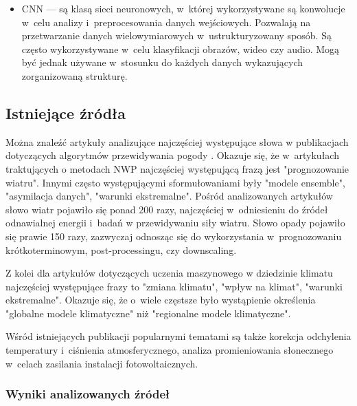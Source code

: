 \begin{itemize}
    \item CNN — są klasą sieci neuronowych, w~której wykorzystywane są konwolucje w~celu 
    analizy i~preprocesowania danych wejściowych. Pozwalają na przetwarzanie danych wielowymiarowych
    w~ustrukturyzowany sposób. Są często wykorzystywane w~celu klasyfikacji obrazów, wideo czy
    audio. Mogą być jednak używane w~stosunku do każdych danych wykazujących zorganizowaną strukturę.

\end{itemize}

\subsection{Istniejące źródła}

Można znaleźć artykuły analizujące najczęściej występujące słowa
w publikacjach dotyczących algorytmów przewidywania pogody 
\cite{ml-in-weather-prediction}. Okazuje się, że w~artykułach traktujących o
metodach NWP najczęściej występującą frazą jest "prognozowanie wiatru". Innymi 
często występującymi sformułowaniami były "modele ensemble", "asymilacja danych",
"warunki ekstremalne". Pośród analizowanych artykułów słowo wiatr pojawiło się
ponad 200 razy, najczęściej w~odniesieniu do źródeł odnawialnej energii i~badań
w przewidywaniu siły wiatru. Słowo opady pojawiło się prawie 150 razy, zazwyczaj
odnosząc się do wykorzystania w~prognozowaniu krótkoterminowym, post-processingu, czy
downscaling. 

Z kolei dla artykułów dotyczących uczenia maszynowego
w dziedzinie klimatu najczęściej występujące frazy to "zmiana klimatu", 
"wpływ na klimat", "warunki ekstremalne". Okazuje się, że o~wiele częstsze było
wystąpienie określenia "globalne modele klimatyczne" niż "regionalne modele 
klimatyczne". 

Wśród istniejących publikacji popularnymi tematami są także korekcja odchylenia 
temperatury i~ciśnienia atmosferycznego, analiza promieniowania słonecznego w~celach
zasilania instalacji fotowoltaicznych.

\subsubsection*{Wyniki analizowanych źródeł}

